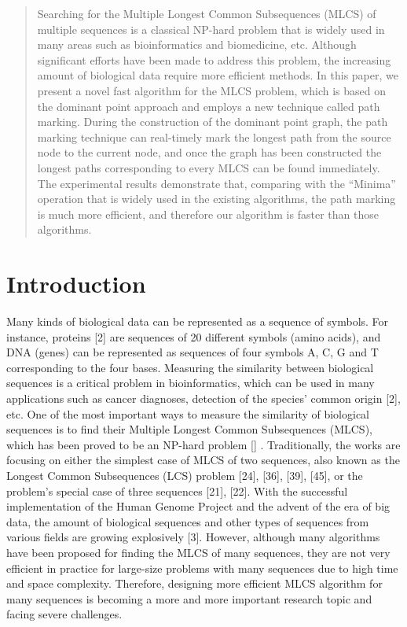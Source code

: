 \begin{abstract}

  Searching for the Multiple Longest Common Subsequences (MLCS) of
  multiple sequences is a classical NP-hard problem that is widely
  used in many areas such as bioinformatics and biomedicine,
  etc. Although significant efforts have been made to address this
  problem, the increasing amount of biological data require more
  efficient methods. In this paper, we present a novel fast algorithm
  for the MLCS problem, which is based on the dominant point approach
  and employs a new technique called path marking. During the
  construction of the dominant point graph, the path marking technique
  can real-timely mark the longest path from the source node to the
  current node, and once the graph has been constructed the longest
  paths corresponding to every MLCS can be found immediately. The
  experimental results demonstrate that, comparing with the ``Minima''
  operation that is widely used in the existing algorithms, the path
  marking is much more efficient, and therefore our algorithm is
  faster than those algorithms.

\end{abstract}



\section{Introduction}
\label{sec:introduction}


Many kinds of biological data can be represented as a sequence of
symbols. For instance, proteins [2] are sequences of 20 different
symbols (amino acids), and DNA (genes) can be represented as sequences
of four symbols A, C, G and T corresponding to the four bases.
Measuring the similarity between biological sequences is a critical
problem in bioinformatics, which can be used in many applications such
as cancer diagnoses, detection of the species’ common origin [2],
etc. One of the most important ways to measure the similarity of
biological sequences is to find their Multiple Longest Common
Subsequences (MLCS), which has been proved to be an NP-hard problem []
. Traditionally, the works are focusing on either the simplest case of
MLCS of two sequences, also known as the Longest Common Subsequences
(LCS) problem [24], [36], [39], [45], or the problem’s special case
of three sequences [21], [22].  With the successful implementation of
the Human Genome Project and the advent of the era of big data, the
amount of biological sequences and other types of sequences from
various fields are growing explosively [3]. However, although many
algorithms have been proposed for finding the MLCS of many sequences,
they are not very efficient in practice for large-size problems with
many sequences due to high time and space complexity. Therefore,
designing more efficient MLCS algorithm for many sequences is becoming
a more and more important research topic and facing severe challenges.



